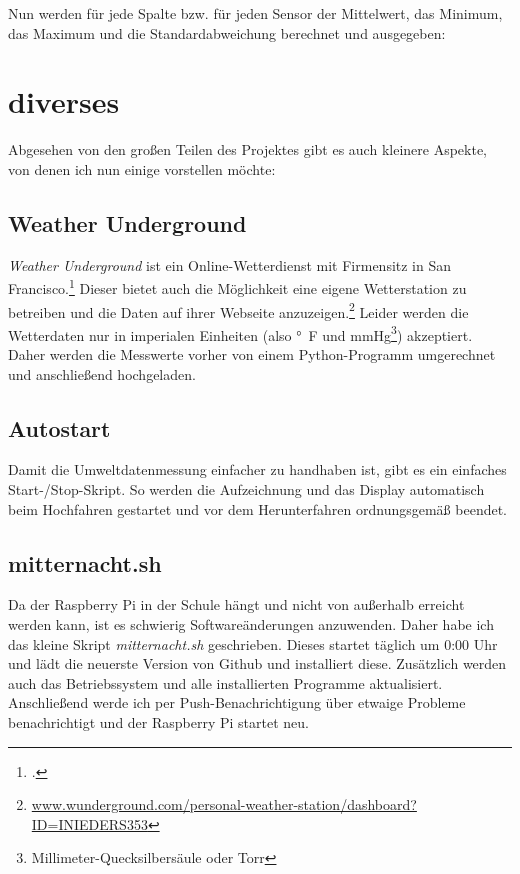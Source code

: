 
Nun werden für jede Spalte bzw. für jeden Sensor der Mittelwert, das Minimum, das Maximum und die \gls{Standardabweichung} berechnet und ausgegeben:


\section{diverses}
\label{sec:diverses}

Abgesehen von den großen Teilen des Projektes gibt es auch kleinere Aspekte, von denen ich nun einige vorstellen möchte:

\subsection{Weather Underground}
\label{subsec:wunderground}

\emph{Weather Underground} ist ein Online-Wetterdienst mit Firmensitz in San Francisco.\footcite{wiki:wunderground} Dieser bietet auch die Möglichkeit eine eigene Wetterstation zu betreiben und die Daten auf ihrer Webseite anzuzeigen.\footnote{\href{http://www.wunderground.com/personal-weather-station/dashboard?ID=INIEDERS353}{www.wunderground.com/personal-weather-station/dashboard?ID=INIEDERS353}}
Leider werden die Wetterdaten nur in imperialen Einheiten (also \si{\degree F} und \si{\mmHg}\footnote{Millimeter-Quecksilbersäule oder Torr}) akzeptiert. Daher werden die Messwerte vorher von einem \gls{Python}-Programm umgerechnet und anschließend hochgeladen.

\subsection{Autostart}
\label{subsec:Autostart}

Damit die Umweltdatenmessung einfacher zu handhaben ist, gibt es ein einfaches Start-/Stop-Skript. So werden die Aufzeichnung und das Display automatisch beim Hochfahren gestartet und vor dem Herunterfahren ordnungsgemäß beendet.

\subsection{mitternacht.sh}
\label{subsec:mitternacht.sh}

Da der Raspberry Pi in der Schule hängt und nicht von außerhalb erreicht werden kann, ist es schwierig Softwareänderungen anzuwenden. Daher habe ich das kleine Skript \emph{mitternacht.sh} geschrieben. Dieses startet täglich um 0:00 Uhr und lädt die neuerste Version von \gls{Github} und installiert diese. Zusätzlich werden auch das Betriebssystem und alle installierten Programme aktualisiert. Anschließend werde ich per Push-Benachrichtigung über etwaige Probleme benachrichtigt und der Raspberry Pi startet neu.

